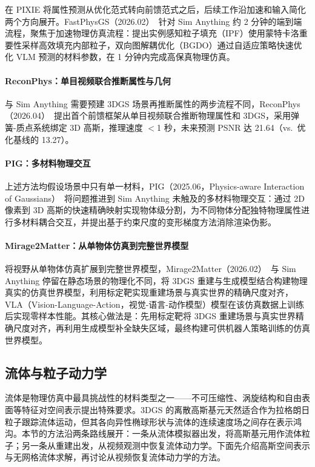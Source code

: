 在 PIXIE 将属性预测从优化范式转向前馈范式之后，后续工作沿加速和输入简化两个方向展开。FastPhysGS（2026.02）~\cite{2602_01723}针对 Sim Anything 约 2 分钟的端到端流程，聚焦于加速物理仿真流程：提出实例感知粒子填充（IPF）使用蒙特卡洛重要性采样高效填充内部粒子，双向图解耦优化（BGDO）通过自适应策略快速优化 VLM 预测的材料参数，在 1 分钟内完成高保真物理仿真。

\paragraph{ReconPhys：单目视频联合推断属性与几何}

与 Sim Anything 需要预建 3DGS 场景再推断属性的两步流程不同，ReconPhys（2026.04）~\cite{2604_07882}提出首个前馈框架从单目视频联合推断物理属性和 3DGS，采用弹簧-质点系统绑定 3D 高斯，推理速度 $<$1 秒，未来预测 PSNR 达 21.64（vs.\ 优化基线的 13.27）。

\paragraph{PIG：多材料物理交互}

上述方法均假设场景中只有单一材料，PIG（2025.06，Physics-aware Interaction of Gaussians）~\cite{2506_07657}将问题推进到 Sim Anything 未触及的多材料物理交互：通过 2D 像素到 3D 高斯的快速精确映射实现物体级分割，为不同物体分配独特物理属性进行多材料耦合交互，并提出基于约束尺度的变形梯度方法消除渲染伪影。

\paragraph{Mirage2Matter：从单物体仿真到完整世界模型}

将视野从单物体仿真扩展到完整世界模型，Mirage2Matter（2026.02）~\cite{2602_00096}与 Sim Anything 停留在静态场景的物理化不同，将 3DGS 重建与生成模型结合构建物理真实的仿真世界模型，利用标定靶实现重建场景与真实世界的精确尺度对齐，VLA（Vision-Language-Action，视觉-语言-动作模型）模型在该仿真数据上训练后实现零样本性能。其核心做法是：先用标定靶将 3DGS 重建场景与真实世界精确尺度对齐，再利用生成模型补全缺失区域，最终构建可供机器人策略训练的仿真世界模型。

\subsection{流体与粒子动力学}

流体是物理仿真中最具挑战性的材料类型之一——不可压缩性、涡旋结构和自由表面等特征对空间表示提出特殊要求。3DGS 的离散高斯基元天然适合作为拉格朗日粒子跟踪流体运动，但其各向异性椭球形状与流体的连续速度场之间存在表示鸿沟。本节的方法沿两条路线展开：一条从流体模拟器出发，将高斯基元用作流体粒子；另一条从重建出发，从视频观测中恢复流体动力学。下面先介绍高斯空间表示与无网格流体求解，再讨论从视频恢复流体动力学的方法。

